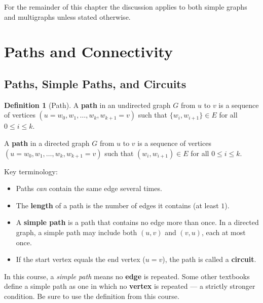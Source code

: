 \documentclass[11pt, a4paper, notitlepage]{report}
\theoremstyle{definition}
\newtheorem{definition}[theorem]{Definition}
\theoremstyle{remark}
\begin{document}
For the remainder of this chapter the discussion applies to both simple graphs and multigraphs
unless stated otherwise.

\section{Paths and Connectivity}
\label{sec:paths-connectivity}

\subsection{Paths, Simple Paths, and Circuits}
\label{subsec:paths}

\begin{definition}[Path]
\label{def:path}
A \textbf{path} in an undirected graph $G$ from $u$ to $v$ is a sequence of vertices
$(u = w_0, w_1, \dots, w_k, w_{k+1} = v)$ such that $\{w_i, w_{i+1}\} \in E$ for all
$0 \le i \le k$.

A \textbf{path} in a directed graph $G$ from $u$ to $v$ is a sequence of vertices
$(u = w_0, w_1, \dots, w_k, w_{k+1} = v)$ such that $(w_i, w_{i+1}) \in E$ for all
$0 \le i \le k$.
\end{definition}

Key terminology:
\begin{itemize}
  \item Paths \emph{can} contain the same edge several times.
  \item The \textbf{length} of a path is the number of edges it contains (at least $1$).
  \item A \textbf{simple path} is a path that contains no edge more than once.
    In a directed graph, a simple path may include both $(u,v)$ and $(v,u)$, each at most once.
  \item If the start vertex equals the end vertex ($u = v$), the path is called a \textbf{circuit}.
\end{itemize}

\begin{warning}[title={Warning: Definition of ``Simple Path''}]
In this course, a \emph{simple path} means no \textbf{edge} is repeated. Some other
textbooks define a simple path as one in which no \textbf{vertex} is repeated ---
a strictly stronger condition. Be sure to use the definition from this course.
\end{warning}
\end{document}
